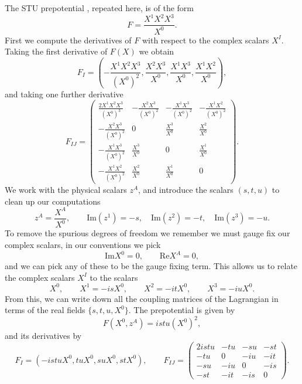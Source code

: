The STU prepotential , repeated here, is of the form
\begin{equation*}
    F= \frac{X^1 X^2 X^3}{X^0}.
\end{equation*}
First we compute the derivatives of $F$ with respect to the complex scalars $X^I$. Taking the first derivative of $F(X)$ we obtain
\begin{equation}
    F_I = \left(-\frac{X^1 X^2 X^3}{(X^0)^2}, \frac{ X^2 X^3}{X^0} , \frac{X^1  X^3}{X^0} , \frac{X^1 X^2 }{X^0} \right),
\end{equation}
and taking one further derivative
\begin{equation}
    F_{IJ} =  \begin{pmatrix} \frac{2X^1 X^2 X^3}{(X^0)^3} & -\frac{X^2 X^3}{(X^0)^2} & -\frac{X^1 X^3}{(X^0)^2} & -\frac{X^1 X^2}{(X^0)^2} \\[6pt]
    -\frac{X^2 X^3}{(X^0)^2} & 0 & \frac{X^3}{X^0} & \frac{X^2}{X^0} \\[6pt]
    -\frac{X^1 X^3}{(X^0)^2} & \frac{X^3}{X^0} & 0 & \frac{X^1}{X^0} \\[6pt]
    -\frac{X^1 X^2}{(X^0)^2} & \frac{X^2}{X^0} & \frac{X^1}{X^0} & 0
    \end{pmatrix}.
\end{equation}
We work with the physical scalars $z^A$, and introduce the scalars $(s,t,u)$ to clean up our computations
\begin{equation}
  z^A = \frac{X^A}{X^0}, \qquad  \text{Im}(z^1) = -s, \quad \text{Im}(z^2) = -t,\quad  \text{Im}(z^3) = -u.
\end{equation}
To remove the spurious degrees of freedom we remember we must gauge fix our complex scalars, in our conventions we pick
\begin{equation*}
    \text{Im}X^0 = 0, \qquad \text{Re}X^A = 0,
\end{equation*}
and we can pick any of these to be the gauge fixing term. This allows us to relate the complex scalars $X^I$ to the scalars
\begin{equation*}
          X^0, \qquad X^1 = -isX^0,\qquad X^2 = -itX^0, \qquad X^3 = -iuX^0.    
\end{equation*}
From this, we can write down all the coupling matrices of the Lagrangian in terms of the real fields $\{s,t,u,X^0\}$. The prepotential is given by
\begin{equation}
  F(X^0,z^A) = istu (X^0)^2,
\end{equation}
and its derivatives by
\begin{equation}
F_I = \left(-istu X^0, tuX^0 , suX^0 , stX^0\right),
\qquad 
F_{IJ} =  \begin{pmatrix} 2istu & -tu & -su & -st  \\[4pt]
    -tu & 0 &-iu & -it \\[4pt]
   -su & -iu & 0 & -is \\[4pt]
  -st & -it & -is & 0
    \end{pmatrix}.
\end{equation}
